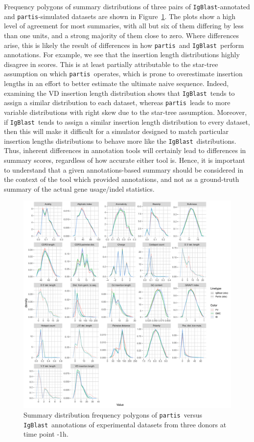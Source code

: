 \documentclass{article}
\newcommand{\partis}{\texttt{partis}}
\newcommand{\igblast}{\texttt{IgBlast}}
\begin{document}
Frequency polygons of summary distributions of three pairs of \igblast-annotated and \partis-simulated datasets are shown in Figure~\ref{fig:PartisIgBlastFreqpolys}.
The plots show a high level of agreement for most summaries, with all but six of them differing by less than one units, and a strong majority of them close to zero.
Where differences arise, this is likely the result of differences in how \partis\ and \igblast\ perform annotations.
For example, we see that the insertion length distributions highly disagree in scores.
This is at least partially attributable to the star-tree assumption on which \partis\ operates, which is prone to overestimate insertion lengths in an effort to better estimate the ultimate naive sequence.
Indeed, examining the VD insertion length distribution shows that \igblast\ tends to assign a similar distribution to each dataset, whereas \partis\ leads to more variable distributions with right skew due to the star-tree assumption.
Moreover, if \igblast\ tends to assign a similar insertion length distribution to every dataset, then this will make it difficult for a simulator designed to match particular insertion lengths distributions to behave more like the \igblast\ distributions.
Thus, inherent differences in annotation tools will certainly lead to differences in summary scores, regardless of how accurate either tool is.
Hence, it is important to understand that a given annotations-based summary should be considered in the context of the tool which provided annotations, and not as a ground-truth summary of the actual gene usage/indel statistics.

\begin{figure}
    \includegraphics[width=\linewidth]{Figures/PartisScores/pi_freqpoly.pdf}
    \caption{Summary distribution frequency polygons of \partis\ versus \igblast\ annotations of experimental datasets from three donors at time point -1h.}
    \label{fig:PartisIgBlastFreqpolys}
\end{figure}
\end{document}
